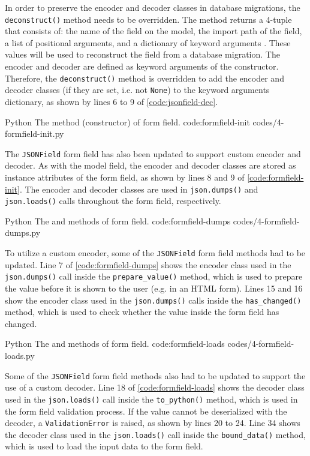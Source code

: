 In order to preserve the encoder and decoder classes in database migrations,
the \verb|deconstruct()| method needs to be overridden. The method returns a
4-tuple that consists of: the name of the field on the model, the import path
of the field, a list of positional arguments, and a dictionary of keyword
arguments \cite{django:model_fields}. These values will be used to reconstruct
the field from a database migration. The encoder and decoder are defined as
keyword arguments of the constructor. Therefore, the \verb|deconstruct()|
method is overridden to add the encoder and decoder classes (if they are set,
i.e. not \verb|None|) to the keyword arguments dictionary, as shown by lines 6
to 9 of \autoref{code:jsonfield-dec}.

\listing
{Python}
{The  method (constructor) of  form field.}
{code:formfield-init}
{codes/4-formfield-init.py}

The \verb|JSONField| form field has also been updated to support custom encoder
and decoder. As with the model field, the encoder and decoder classes are
stored as instance attributes of the form field, as shown by lines 8 and 9 of
\autoref{code:formfield-init}. The encoder and decoder classes are used in
\verb|json.dumps()| and \verb|json.loads()| calls throughout the form field,
respectively.

\listing
{Python}
{The  and  methods of
 form field.}
{code:formfield-dumps}
{codes/4-formfield-dumps.py}

To utilize a custom encoder, some of the \verb|JSONField| form field methods
had to be updated. Line 7 of \autoref{code:formfield-dumps} shows the encoder
class used in the \verb|json.dumps()| call inside the \verb|prepare_value()|
method, which is used to prepare the value before it is shown to the user (e.g.
in an HTML form). Lines 15 and 16 show the encoder class used in the
\verb|json.dumps()| calls inside the \verb|has_changed()| method, which is used
to check whether the value inside the form field has changed.

\listing
{Python}
{The  and  methods of 
form field.}
{code:formfield-loads}
{codes/4-formfield-loads.py}

Some of the \verb|JSONField| form field methods also had to be updated to
support the use of a custom decoder. Line 18 of \autoref{code:formfield-loads}
shows the decoder class used in the \verb|json.loads()| call inside the
\verb|to_python()| method, which is used in the form field validation process.
If the value cannot be deserialized with the decoder, a \verb|ValidationError|
is raised, as shown by lines 20 to 24. Line 34 shows the decoder class used in
the \verb|json.loads()| call inside the \verb|bound_data()| method, which is
used to load the input data to the form field.

